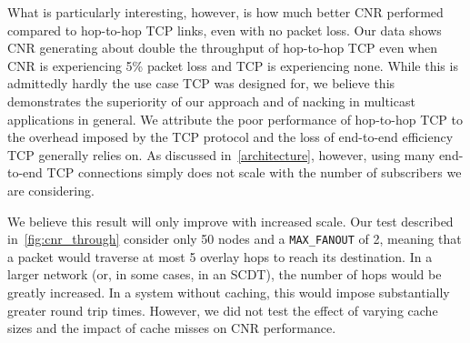 What is particularly interesting, however, is how much better CNR performed compared to hop-to-hop TCP links, even with no packet loss. Our data shows CNR generating about double the throughput of hop-to-hop TCP even when CNR is experiencing 5\% packet loss and TCP is experiencing none. While this is admittedly hardly the use case TCP was designed for, we believe this demonstrates the superiority of our approach and of nacking in multicast applications in general. We attribute the poor performance of hop-to-hop TCP to the overhead imposed by the TCP protocol and the loss of end-to-end efficiency \cite{end-to-end-args} TCP generally relies on. As discussed in~\autoref{architecture}, however, using many end-to-end TCP connections simply does not scale with the number of subscribers we are considering.

We believe this result will only improve with increased scale. Our test described  in~\autoref{fig:cnr_through} consider only 50 nodes and a \texttt{MAX\_FANOUT} of 2, meaning that a packet would traverse at most 5 overlay hops to reach its destination. In a larger network (or, in some cases, in an SCDT), the number of hops would be greatly increased. In a system without caching, this would impose substantially greater round trip times. However, we did not test the effect of varying cache sizes and the impact of cache misses on CNR performance.
